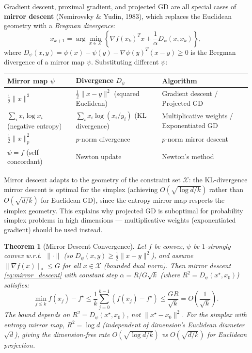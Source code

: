 \documentclass[11pt,a4paper]{article}
\newtheorem{theorem}{Theorem}[section]
\theoremstyle{definition}
\begin{document}
Gradient descent, proximal gradient, and projected GD are all special cases of \textbf{mirror descent} (Nemirovsky \& Yudin, 1983), which replaces the Euclidean geometry with a \emph{Bregman divergence}:
\begin{equation}
x_{k+1} = \arg\min_{x \in \mathcal{X}} \left\{ \nabla f(x_k)^T x + \frac{1}{\alpha} D_\psi(x, x_k) \right\},
\label{eq:mirror_descent}
\end{equation}
where $D_\psi(x, y) = \psi(x) - \psi(y) - \nabla\psi(y)^T(x-y) \geq 0$ is the Bregman divergence of a mirror map $\psi$. Substituting different $\psi$:
\begin{center}
\begin{tabular}{lll}
\toprule
\textbf{Mirror map $\psi$} & \textbf{Divergence $D_\psi$} & \textbf{Algorithm} \\
\midrule
$\frac{1}{2}\|x\|^2$ & $\frac{1}{2}\|x-y\|^2$ (squared Euclidean) & Gradient descent / Projected GD \\
$\sum_i x_i \log x_i$ (negative entropy) & $\sum_i x_i \log(x_i/y_i)$ (KL divergence) & Multiplicative weights / Exponentiated GD \\
$\frac{1}{2}\|x\|_p^2$ & $p$-norm divergence & $p$-norm mirror descent \\
$\psi = f$ (self-concordant) & Newton update & Newton's method \\
\bottomrule
\end{tabular}
\end{center}
Mirror descent adapts to the geometry of the constraint set $\mathcal{X}$: the KL-divergence mirror descent is optimal for the simplex (achieving $O(\sqrt{\log d / k})$ rather than $O(\sqrt{d/k})$ for Euclidean GD), since the entropy mirror map respects the simplex geometry. This explains why projected GD is suboptimal for probability simplex problems in high dimensions --- multiplicative weights (exponentiated gradient) should be used instead.

\begin{theorem}[Mirror Descent Convergence]
\label{thm:mirror_descent}
Let $f$ be convex, $\psi$ be $1$-strongly convex w.r.t.\ $\|\cdot\|$ (so $D_\psi(x,y) \geq \frac{1}{2}\|x-y\|^2$), and assume $\|\nabla f(x)\|_* \leq G$ for all $x \in \mathcal{X}$ (bounded dual norm). Then mirror descent \eqref{eq:mirror_descent} with constant step $\alpha = R/G\sqrt{k}$ (where $R^2 = D_\psi(x^{\star}, x_0)$) satisfies:
\begin{equation}
\min_{j \leq k} f(x_j) - f^{\star} \leq \frac{1}{k}\sum_{j=0}^{k-1}(f(x_j) - f^{\star}) \leq \frac{G R}{\sqrt{k}} = O\!\left(\frac{1}{\sqrt{k}}\right).
\label{eq:md_rate}
\end{equation}
The bound depends on $R^2 = D_\psi(x^{\star}, x_0)$, not $\|x^{\star} - x_0\|^2$. For the simplex with entropy mirror map, $R^2 = \log d$ (independent of dimension's Euclidean diameter $\sqrt{d}$), giving the dimension-free rate $O(\sqrt{\log d / k})$ vs $O(\sqrt{d/k})$ for Euclidean projection.
\end{theorem}
\end{document}
